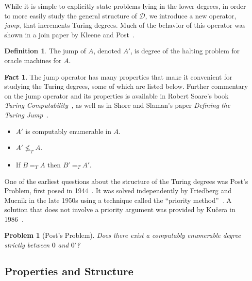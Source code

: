 \documentclass[psamsfonts]{amsart}
\newtheorem{prob}[thm]{Problem}
\theoremstyle{definition}
\newtheorem{defn}[thm]{Definition}
\newtheorem{fact}[thm]{Fact}
\theoremstyle{remark}
\numberwithin{equation}{section}
\begin{document}
While it is simple to explicitly state problems lying in the lower degrees,
in order to more easily study the general structure of $\mathcal{D}$, we
introduce a new operator, \emph{jump}, that increments Turing degrees. Much of
the behavior of this operator was shown in a join paper by Kleene and Post~\cite{kleene54_upper_semi_lattic_degrees_recur_unsol}.

\begin{defn}
  The jump of $A$, denoted $A'$, is degree of the halting problem for oracle
  machines for $A$.
\end{defn}

\begin{fact}
  The jump operator has many properties that make it convenient for studying the
Turing degrees, some of which are listed below. Further commentary on the jump operator
and its properties is available in Robert Soare's book \emph{Turing
  Computability}~\cite{soare16_turin_comput}, as well as in Shore and Slaman's
paper \emph{Defining the Turing Jump}~\cite{shore99:_defin_turin_jump}.
  \begin{itemize}
  \item $A'$ is computably enumerable in $A$.
  \item $A' \not\leq_T A$.
  \item If $B=_TA$ then $B'=_TA'$.
  \end{itemize}
\end{fact}

One of the earliest questions about the structure of the Turing degrees was
Post's Problem, first posed in 1944~\cite{post44:_recur}. It was solved
independently by Friedberg and Mucnik in the late 1950s using a technique
called the ``priority method''~\cite{Friedberg236, muchnik1956unsolvability}. A solution that does not
involve a priority argument was provided by Ku\v{c}era in 1986~\cite{Kucera:1986:APS:22416.22462}.

\begin{prob}[Post's Problem]  
  Does there exist a computably enumerable degree strictly between $0$ and $0'$?
\end{prob}

\subsection{Properties and Structure}
\end{document}
